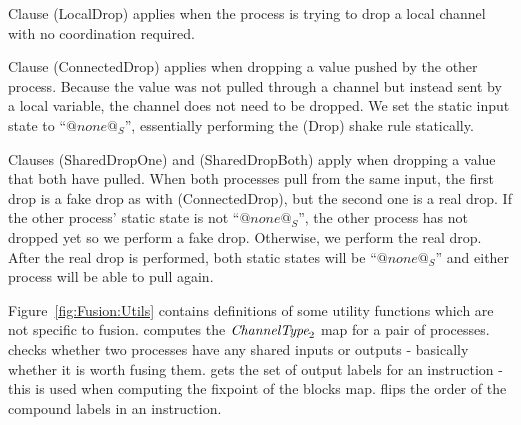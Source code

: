 Clause (LocalDrop) applies when the process is trying to drop a local channel with no coordination required.

Clause (ConnectedDrop) applies when dropping a value pushed by the other process.
Because the value was not pulled through a channel but instead sent by a local variable, the channel does not need to be dropped.
We set the static input state to ``$@none@_S$'', essentially performing the (Drop) shake rule statically.

Clauses (SharedDropOne) and (SharedDropBoth) apply when dropping a value that both have pulled.
When both processes pull from the same input, the first drop is a fake drop as with (ConnectedDrop), but the second one is a real drop.
If the other process' static state is not ``$@none@_S$'', the other process has not dropped yet so we perform a fake drop.
Otherwise, we perform the real drop.
After the real drop is performed, both static states will be ``$@none@_S$'' and either process will be able to pull again.



Figure~\ref{fig:Fusion:Utils} contains definitions of some utility functions which are not specific to fusion.
 computes the $\textit{ChannelType}_2$ map for a pair of processes.
 checks whether two processes have any shared inputs or outputs - basically whether it is worth fusing them.
 gets the set of output labels for an instruction - this is used when computing the fixpoint of the blocks map.
 flips the order of the compound labels in an instruction.
